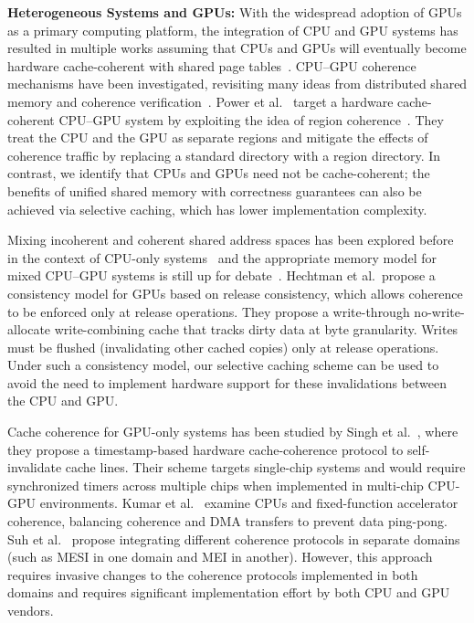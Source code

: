 \textbf{Heterogeneous Systems and GPUs:} With the widespread adoption of GPUs as
a primary computing platform, the integration of CPU and GPU systems has
resulted in multiple works assuming that CPUs and GPUs will eventually become
hardware cache-coherent with shared page
tables~\cite{Power2014,Pichai2014,Agarwal2015,Agarwal2015b}.  CPU--GPU coherence
mechanisms have been investigated, revisiting many ideas from distributed shared
memory and coherence
verification~\cite{Gelado2010,Power2013,wu2014,Kaxiras2013}. Power et
al.~\cite{Power2013} target a hardware cache-coherent CPU--GPU system by
exploiting the idea of region
coherence~\cite{Cantin2005,Alisafaee2012,Moshovos2005,Zebchuk2007}. They treat
the CPU and the GPU as separate regions and mitigate the effects of coherence
traffic by replacing a standard directory with a region directory.  In contrast,
we identify that CPUs and GPUs need not be cache-coherent; the benefits of
unified shared memory with correctness guarantees can also be achieved via
selective caching, which has lower implementation complexity.

Mixing incoherent and coherent shared address spaces has been explored before in
the context of CPU-only systems~\cite{Huh04} and the appropriate memory model
for mixed CPU--GPU systems is still up for
debate~\cite{Lim2012,Hechtman2014,Hower2014,Gaster2015}.  Hechtman et
al.~propose a consistency model for GPUs based on release consistency, which
allows coherence to be enforced only at release operations.  They propose a
write-through no-write-allocate write-combining cache that tracks dirty data at
byte granularity.  Writes must be flushed (invalidating other cached copies)
only at release operations.  Under such a consistency model, our selective
caching scheme can be used to avoid the need to implement hardware support for
these invalidations between the CPU and GPU.

Cache coherence for GPU-only systems has been studied by Singh et
al.~\cite{Singh2013}, where they propose a timestamp-based hardware
cache-coherence protocol to self-invalidate cache lines. Their scheme targets
single-chip systems and would require synchronized timers across multiple chips
when implemented in multi-chip CPU-GPU environments.  Kumar et
al.~\cite{Kumar2015} examine CPUs and fixed-function accelerator coherence,
balancing coherence and DMA transfers to prevent data ping-pong.  Suh et
al.~\cite{Suh2004} propose integrating different coherence protocols in separate
domains (such as MESI in one domain and MEI in another).  However, this approach
requires invasive changes to the coherence protocols implemented in both domains
and requires significant implementation effort by both CPU and GPU vendors.

